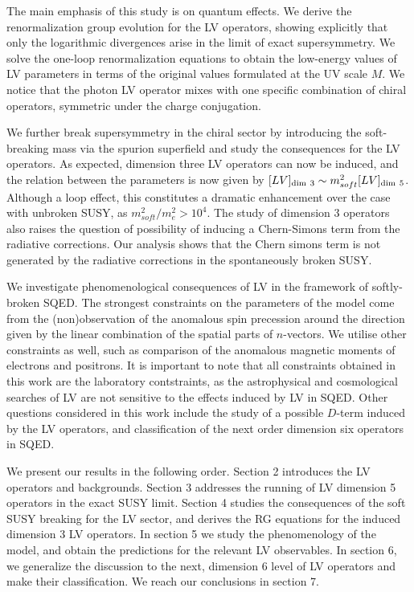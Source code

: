 \documentclass[12pt]{revtex4}
\begin{document}
The main emphasis of this study is on quantum effects. We derive the
renormalization group evolution for the LV operators, showing
explicitly that only the logarithmic divergences arise in the limit of
exact supersymmetry. We solve the one-loop renormalization equations
to obtain the low-energy values of LV parameters in terms of the
original values formulated at the UV scale $M$. We notice that the
photon LV operator mixes with one specific combination of  
chiral operators, symmetric under the charge conjugation. 

We further break supersymmetry in the chiral sector by introducing the 
soft-breaking mass via the spurion superfield and study the consequences for the 
LV operators. As expected, dimension three LV operators can now be induced, and the 
relation between the parameters is now given by 
$[LV]_{\rm dim~3} \sim m_{soft}^2 [LV]_{\rm dim~5}$. 
Although a loop effect, this constitutes a dramatic enhancement over
the case with unbroken SUSY, as $ m_{soft}^2/m_e^2 > 10^4$.  
The study of dimension 3 operators also raises the question of possibility of 
inducing  a Chern-Simons term from the radiative corrections.
Our analysis shows that the Chern simons term is not generated by the 
radiative corrections in the spontaneously broken SUSY.

We investigate phenomenological consequences of LV in the framework of
softly-broken SQED. The strongest constraints on the parameters of the
model come from the  (non)observation of the anomalous spin precession
around the direction given by the linear combination of the spatial
parts of $n$-vectors. We utilise other constraints as well,  
such as comparison of the anomalous magnetic moments of electrons and 
positrons. It is important to note that all constraints obtained in this 
work are the laboratory contstraints, as the astrophysical and cosmological 
searches of LV are not sensitive to the effects induced by LV in SQED. 
Other questions considered in this work include the study of a possible $D$-term 
induced by the LV operators, and classification of the next order
dimension six operators in SQED. 

We present our results in the following order. Section 2 introduces
the LV operators and backgrounds. Section 3 addresses the running of
LV dimension 5 operators in the exact SUSY limit. Section 4 studies
the consequences of the soft SUSY breaking for the LV sector, and
derives the RG equations for the induced dimension 3 LV operators.  In
section 5 we study the phenomenology of the model, and obtain the
predictions for the relevant LV observables. In section 6, we
generalize the discussion to the next, dimension 6 level of LV
operators and make their classification. We reach our conclusions in
section 7.  
\end{document}
